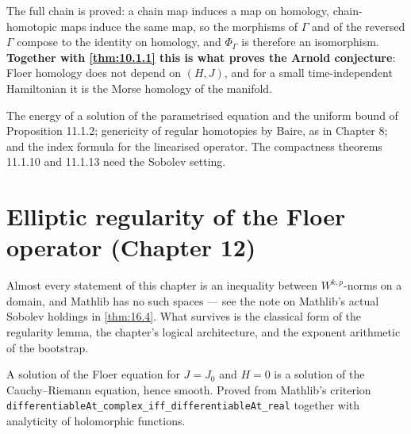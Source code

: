 \begin{theorem}
  \label{thm:11.invariance}
  \leanok
  The full chain is proved: a chain map induces a map on homology, chain-homotopic
  maps induce the same map, so the morphisms of $\Gamma$ and of the reversed
  $\Gamma$ compose to the identity on homology, and $\Phi_\Gamma$ is therefore an
  isomorphism.  \textbf{Together with \ref{thm:10.1.1} this is what proves the
  Arnold conjecture}: Floer homology does not depend on $(H,J)$, and for a small
  time-independent Hamiltonian it is the Morse homology of the manifold.
\end{theorem}

\begin{theorem}
  \label{thm:11.1}
  \notready
  The energy of a solution of the parametrised equation and the uniform bound of
  Proposition 11.1.2; genericity of regular homotopies by Baire, as in Chapter 8;
  and the index formula for the linearised operator.  The compactness theorems
  11.1.10 and 11.1.13 need the Sobolev setting.
\end{theorem}

\chapter{Elliptic regularity of the Floer operator (Chapter 12)}

Almost every statement of this chapter is an inequality between
$W^{k,p}$-norms on a domain, and Mathlib has no such spaces --- see the note on
Mathlib's actual Sobolev holdings in \ref{thm:16.4}.  What survives is the
classical form of the regularity lemma, the chapter's logical architecture, and
the exponent arithmetic of the bootstrap.

\begin{lemma}
  \label{lem:12.1.1}
  \leanok
  A solution of the Floer equation for $J = J_0$ and $H = 0$ is a solution of the
  Cauchy--Riemann equation, hence smooth.  Proved from Mathlib's criterion
  \texttt{differentiableAt\_complex\_iff\_differentiableAt\_real} together with
  analyticity of holomorphic functions.
\end{lemma}


